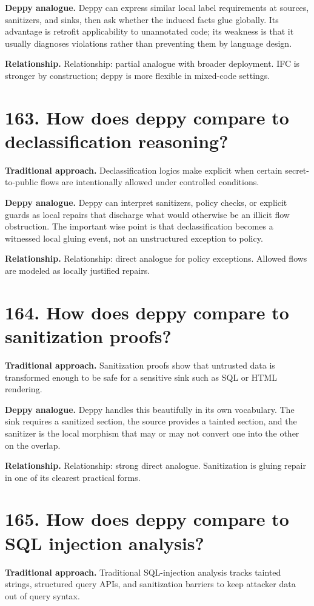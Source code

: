 \documentclass[11pt,openany]{book}
\begin{document}
\textbf{Deppy analogue.} Deppy can express similar local label requirements at sources, sanitizers, and sinks, then ask whether the induced facts glue globally. Its advantage is retrofit applicability to unannotated code; its weakness is that it usually diagnoses violations rather than preventing them by language design.

\textbf{Relationship.} Relationship: partial analogue with broader deployment. IFC is stronger by construction; deppy is more flexible in mixed-code settings.

\section*{163. How does deppy compare to declassification reasoning?}
\textbf{Traditional approach.} Declassification logics make explicit when certain secret-to-public flows are intentionally allowed under controlled conditions.

\textbf{Deppy analogue.} Deppy can interpret sanitizers, policy checks, or explicit guards as local repairs that discharge what would otherwise be an illicit flow obstruction. The important wise point is that declassification becomes a witnessed local gluing event, not an unstructured exception to policy.

\textbf{Relationship.} Relationship: direct analogue for policy exceptions. Allowed flows are modeled as locally justified repairs.

\section*{164. How does deppy compare to sanitization proofs?}
\textbf{Traditional approach.} Sanitization proofs show that untrusted data is transformed enough to be safe for a sensitive sink such as SQL or HTML rendering.

\textbf{Deppy analogue.} Deppy handles this beautifully in its own vocabulary. The sink requires a sanitized section, the source provides a tainted section, and the sanitizer is the local morphism that may or may not convert one into the other on the overlap.

\textbf{Relationship.} Relationship: strong direct analogue. Sanitization is gluing repair in one of its clearest practical forms.

\section*{165. How does deppy compare to SQL injection analysis?}
\textbf{Traditional approach.} Traditional SQL-injection analysis tracks tainted strings, structured query APIs, and sanitization barriers to keep attacker data out of query syntax.
\end{document}
